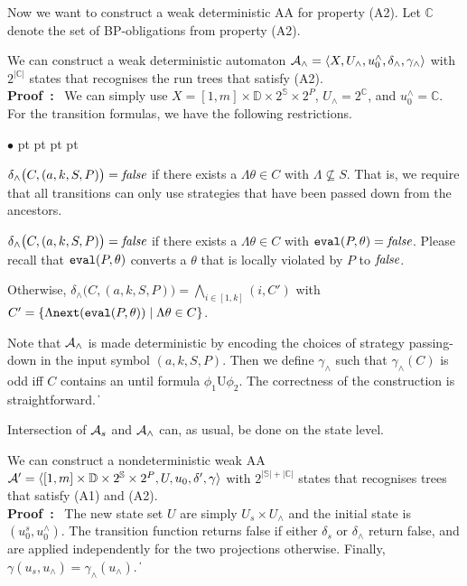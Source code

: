 \documentclass[11pt]{article}
\newcommand{\tteval}{\mbox{\tt eval}}
\newcommand{\ttnxt}{\mbox{\tt next}}
\newcommand{\cala}{{\cal A}}
\newcommand{\false}{\mbox{\em false}}
\newcommand{\pf}{\noindent\mbox{\bf Proof : }}
\newcommand{\until}{\textrm{U}} %
\newcommand{\bbbbc}{{\mathbb C}}
\newcommand{\bbbbd}{{\mathbb D}}
\newcommand{\bbbbs}{{\mathbb S}}
\def\qed{\ifmmode\|\else{\unskip\nobreak\hfil
\penalty50\hskip1em\null\nobreak\hfil$\blacksquare$
\parfillskip=0pt\finalhyphendemerits=0\endgraf}\fi}
\newenvironment{list1}{\begin{list}{$\bullet$}
{\topsep 0 pt \parsep 0 pt \partopsep 0 pt \itemsep 0 pt}}{\end{list}}
\begin{document}
Now we want to construct a weak deterministic AA for property (A2).  
Let $\bbbbc$ denote the set of BP-obligations from property (A2).

{\lemma \label{lemma.A2} 
We can construct a weak deterministic automaton 
$\cala_\wedge=\langle X,U_\wedge,u_0^\wedge,\delta_\wedge, \gamma_\wedge 
\rangle$ with $2^{|\bbbbc|}$ states that recognises the run trees 
that satisfy (A2).
}
\\\pf 
We can simply use
$X = [1,m] \times \bbbbd \times 2^\bbbbs \times 2^P$,
$U_\wedge = 2^\bbbbc$, and 
$u_0^\wedge = \bbbbc$.  
For the transition formulas, 
we have the following restrictions. 
\begin{list1} 
\item $\delta_\wedge \big(C,(a,k,S,P)\big) =\false$ 
  if there exists a $\Lambda\theta\in C$ with $\Lambda\not\subseteq S$.  
  That is, we require that all transitions can only use strategies 
  that have been passed down from the ancestors.  
\item $\delta_\wedge \big(C,(a,k,S,P)\big) =\false$ 
  if there exists a $\Lambda\theta\in C$ with $\tteval(P,\theta)=\false$.  
  Please recall that $\tteval(P,\theta)$ 
  converts a $\theta$ that is locally violated by $P$ to $\false$.  
\item Otherwise, $\delta_\wedge \big(C,(a,k,S,P)\big)
  =\bigwedge_{i\in[1,k]} (i,C')$ with 
  $C' = \{\Lambda\ttnxt(\tteval(P,\theta))\mid \Lambda\theta \in C\}$.  
\end{list1} 
Note that $\cala_\wedge$ is made deterministic by encoding 
the choices of strategy passing-down in the input symbol $(a,k,S,P)$.  
Then we define $\gamma_\wedge$ such that $\gamma_\wedge(C)$ 
is odd iff $C$ contains an until formula $\phi_1 \until \phi_2$.
The correctness of the construction is straightforward.  
\qed 


Intersection of $\cala_s$ and $\cala_\wedge$ can, 
as usual, be done on the state level.

{\corollary \label{coro.aa.Ap}
We can construct a nondeterministic weak AA 
$\cala'=\langle [1,m] \times \bbbbd \times 2^\bbbbs \times 2^P,U,u_0,\delta', \gamma \rangle$ 
with $2^{|\bbbbs|+|\bbbbc|}$ states 
that recognises trees that satisfy (A1) and (A2).
}
\\\pf 
The new state set $U$ are simply $U_s \times U_\wedge$ and 
the initial state is $(u_0^s,u_0^\wedge)$.   
The transition function returns false 
if either $\delta_s$ or $\delta_\wedge$ return false, 
and are applied independently for the two projections otherwise.  
Finally, $\gamma(u_s,u_\wedge) = \gamma_\wedge(u_\wedge)$.
\qed 
\end{document}
